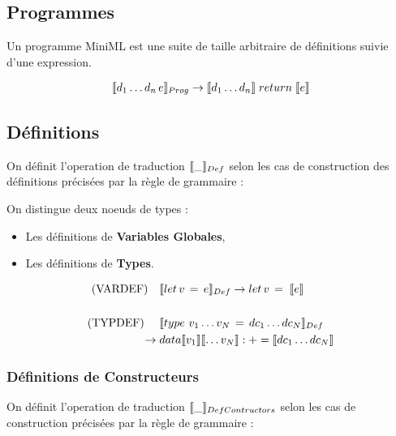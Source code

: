 \documentclass[
  12pt,
]{article}
\providecommand{\tightlist}{%
  \setlength{\itemsep}{0pt}\setlength{\parskip}{0pt}}
\begin{document}
\hypertarget{programmes-1}{%
  \subsection{Programmes}\label{programmes-1}}

Un programme MiniML est une suite de taille arbitraire de définitions suivie d'une expression.

\begin{align*}
  \llbracket d_1 \dots d_n \, e \rrbracket_{Prog} \rightarrow \llbracket d_1 \dots d_n \rrbracket\; return \; \llbracket e \rrbracket
\end{align*}

\pagebreak

\subsection{Définitions}\label{def}

On définit l'operation de traduction \(\llbracket \_ \rrbracket_{Def}\) selon les cas de construction
des définitions précisées par la règle de grammaire : 

On distingue deux noeuds de types :
\begin{itemize}
  \tightlist
  \item
        Les définitions de \textbf{Variables Globales},
  \item
        Les définitions de \textbf{Types}.
\end{itemize}
\begin{align*}
  \text{(VARDEF)}  \quad & \llbracket let \, v \, = \, e \rrbracket_{Def} \rightarrow   let \, v \, = \; \llbracket e \rrbracket     \\
  \\
  \text{(TYPDEF) } \quad & \llbracket type \, \, v_1 \dots v_N \, = \, dc_1 \dots  dc_N \rrbracket_{Def}                         \\
  \rightarrow \;         & data \llbracket v_1 \rrbracket \llbracket \dots v_N \rrbracket : + = \llbracket dc_1 \dots dc_N \rrbracket \\
\end{align*}
\subsubsection{Définitions de Constructeurs}\label{defConstruct}

On définit l'operation de traduction \(\llbracket \_ \rrbracket_{DefContructors}\) selon les cas de construction précisées par la règle de grammaire : 
\end{document}
